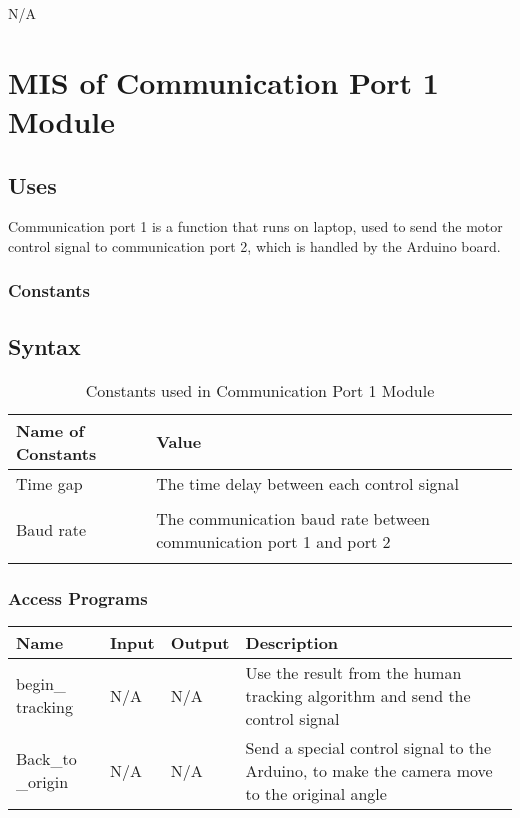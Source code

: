 \documentclass[12pt, titlepage]{article}
\begin{document}
N/A

\newpage

\section{MIS of Communication Port 1 Module} 



\subsection{Uses}
Communication port 1 is a function that runs on laptop, used to send the motor control signal to communication port 2, which is handled by the Arduino board.


\subsubsection{Constants}
\subsection{Syntax}
\begin{table}[H]
\caption{Constants used in Communication Port 1 Module} 
\begin{tabularx}{\textwidth}{XX}
\toprule
\textbf{Name of Constants} & \textbf{Value}\\
\midrule
Time gap & The time delay between each control signal\\\\
Baud rate & The communication baud rate between communication port 1 and port 2\\\\

\bottomrule
\end{tabularx}
\end{table}

\subsubsection{Access Programs}

\begin{center}
\begin{tabular}{|p{2cm}|p{2.5cm}|l|p{7.5cm}|}
\hline
\textbf{Name} & \textbf{Input} & \textbf{Output} & \textbf{Description}\\
\hline
begin\_ tracking & N/A & N/A & Use the result from the human tracking algorithm and send the control signal\\
\hline
Back\_to \_origin & N/A & N/A & Send a special control signal to the Arduino, to make the camera move to the original angle\\
\hline



\end{tabular}
\end{center}
\end{document}

